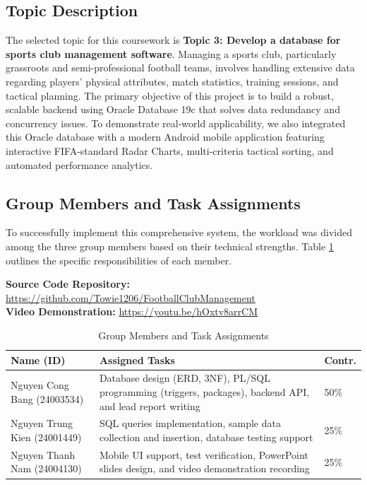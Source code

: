 \documentclass[fonts]{icst}
\begin{document}
\subsection{Topic Description}
The selected topic for this coursework is \textbf{Topic 3: Develop a database for sports club management software}. 
Managing a sports club, particularly grassroots and semi-professional football teams, involves handling extensive data regarding players' physical attributes, match statistics, training sessions, and tactical planning. The primary objective of this project is to build a robust, scalable backend using Oracle Database 19c that solves data redundancy and concurrency issues. To demonstrate real-world applicability, we also integrated this Oracle database with a modern Android mobile application featuring interactive FIFA-standard Radar Charts, multi-criteria tactical sorting, and automated performance analytics.

\subsection{Group Members and Task Assignments}
To successfully implement this comprehensive system, the workload was divided among the three group members based on their technical strengths. Table \ref{tab:tasks} outlines the specific responsibilities of each member.

\textbf{Source Code Repository:} \url{https://github.com/Towie1206/FootballClubManagement}\\[0.2cm]
\textbf{Video Demonstration:} \url{https://youtu.be/hOxtv8arrCM}

\begin{table}[h]
\caption{Group Members and Task Assignments}
\begin{tabular}{|p{}|p{}|p{}|}
\hline
\textbf{Name (ID)} & \textbf{Assigned Tasks} & \textbf{Contr.} \\
\hline
Nguyen Cong Bang (24003534) & Database design (ERD, 3NF), PL/SQL programming (triggers, packages), backend API, and lead report writing & 50\% \\
\hline
Nguyen Trung Kien (24001449) & SQL queries implementation, sample data collection and insertion, database testing support & 25\% \\
\hline
Nguyen Thanh Nam (24004130) & Mobile UI support, test verification, PowerPoint slides design, and video demonstration recording & 25\% \\
\hline
\end{tabular}
\label{tab:tasks}
\end{table}
\end{document}
